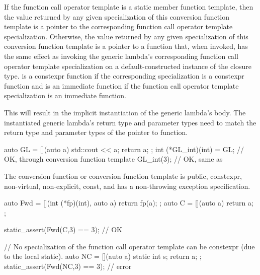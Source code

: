 \pnum
If the function call operator template is a static member function template,
then the value returned by
any given specialization of this conversion function template is
a pointer to the corresponding function call operator template specialization.
Otherwise,
the value returned by any given specialization of this conversion function
template is a pointer to a function  that, when invoked, has the same
effect as invoking the generic lambda's corresponding function call operator
template specialization on a default-constructed instance of the closure type.
 is a constexpr function
if the corresponding specialization is a constexpr function and
 is an immediate function
if the function call operator template specialization is an immediate function.
\begin{note}
This will result in the implicit instantiation of the generic lambda's body.
The instantiated generic lambda's return type and parameter types need to match
the return type and parameter types of the pointer to function.
\end{note}
\begin{example}
\begin{codeblock}
auto GL = [](auto a) { std::cout << a; return a; };
int (*GL_int)(int) = GL;        // OK, through conversion function template
GL_int(3);                      // OK, same as 
\end{codeblock}
\end{example}

\pnum
The conversion function or conversion function template is public,
constexpr, non-virtual, non-explicit, const, and has a non-throwing exception
specification.
\begin{example}
\begin{codeblock}
auto Fwd = [](int (*fp)(int), auto a) { return fp(a); };
auto C = [](auto a) { return a; };

static_assert(Fwd(C,3) == 3);   // OK

// No specialization of the function call operator template can be constexpr (due to the local static).
auto NC = [](auto a) { static int s; return a; };
static_assert(Fwd(NC,3) == 3);  // error
\end{codeblock}
\end{example}

